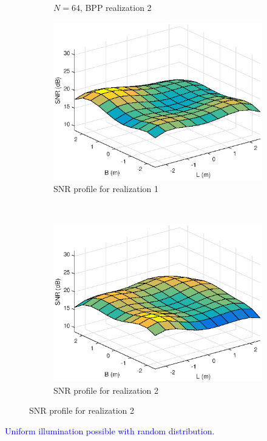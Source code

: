 \documentclass{beamer}
\theoremstyle{remark}
\begin{document}
\begin{frame}
\begin{figure}[h!]
\begin{subfigure}[t]{0.5\columnwidth}
        \caption{$N=64$, BPP realization 2}
\label{fig:two_realize:led2}
    \end{subfigure}
        \begin{subfigure}[t]{0.5\columnwidth}
        \centering
        \includegraphics[scale=.2]{snrRealization1}
        \caption{SNR profile for realization 1}
\label{fig:two_realize:snr1}        
    \end{subfigure}%
    ~ 
    \begin{subfigure}[t]{0.5\columnwidth}
        \centering
        \includegraphics[scale=.2]{snrRealization2}
        \caption{SNR profile for realization 2}
\label{fig:two_realize:snr2}
    \end{subfigure}

    \label{fig:two_realize}
  \end{figure}  
  \begin{list}{}{}
 \item \textcolor{blue}{Uniform illumination possible with random distribution.}
  \end{list}
\end{frame}
\end{document}
